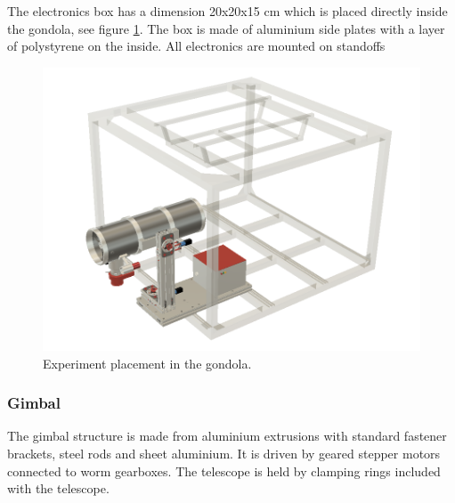 The electronics box has a dimension 20x20x15 cm which is placed directly inside the gondola, see figure \ref{fig::mechanical::ebox}. The box is made of aluminium side plates with a layer of polystyrene on the inside. All electronics are mounted on standoffs 

\begin{figure}[H]
	\centering 
	\includegraphics[scale=0.4]{4-experiment-design/img/mechanical/ebox.png}
	\caption{Experiment placement in the gondola.}
	\label{fig::mechanical::ebox}
\end{figure}


\subsubsection{Gimbal}
\label {sec:4.4.3}

The gimbal structure is made from aluminium extrusions with standard fastener brackets, steel rods and sheet aluminium. It is driven by geared stepper motors connected to worm gearboxes. The telescope is held by clamping rings included with the telescope. 


